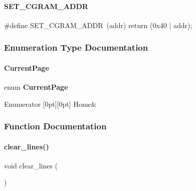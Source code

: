 \mbox{\label{a00032_a3b016cac3c73038fcccfb3c7de10bce0}} 
\paragraph{S\+E\+T\+\_\+\+C\+G\+R\+A\+M\+\_\+\+A\+D\+DR}
{\footnotesize\ttfamily \#define S\+E\+T\+\_\+\+C\+G\+R\+A\+M\+\_\+\+A\+D\+DR~(addr) return (0x40 $\vert$ addr);}



\subsubsection{Enumeration Type Documentation}
\mbox{\label{a00032_a2d8f1d61cec74e044b469a00d45390d1}} 
\paragraph{Current\+Page}
{\footnotesize\ttfamily enum \textbf{ Current\+Page}}

\begin{DoxyEnumFields}{Enumerator}
[0pt][0pt]{}\mbox{\label{a00032_a2d8f1d61cec74e044b469a00d45390d1a8feb334f9ed9ddb8dbc69cfa4fd6b614}} 
Home&\\
\hline

\end{DoxyEnumFields}


\subsubsection{Function Documentation}
\mbox{\label{a00032_a8180985bda05d2858c1cd892c9619a42}} 
\paragraph{clear\+\_\+lines()}
{\footnotesize\ttfamily void clear\+\_\+lines (\begin{DoxyParamCaption}{ }\end{DoxyParamCaption})}


